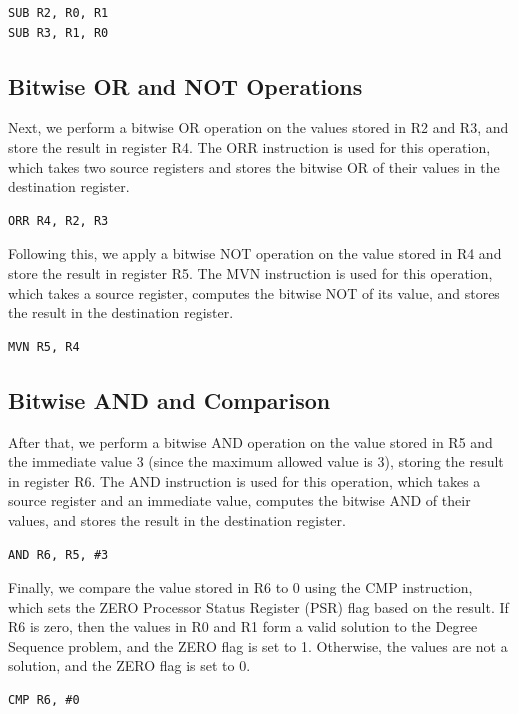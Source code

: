 \begin{verbatim}
SUB R2, R0, R1
SUB R3, R1, R0
\end{verbatim}

\subsection{Bitwise OR and NOT Operations}
Next, we perform a bitwise OR operation on the values stored in R2 and R3, and store the result in register R4. The ORR instruction is used for this operation, which takes two source registers and stores the bitwise OR of their values in the destination register.

\begin{verbatim}
ORR R4, R2, R3
\end{verbatim}

Following this, we apply a bitwise NOT operation on the value stored in R4 and store the result in register R5. The MVN instruction is used for this operation, which takes a source register, computes the bitwise NOT of its value, and stores the result in the destination register.

\begin{verbatim}
MVN R5, R4
\end{verbatim}

\subsection{Bitwise AND and Comparison}
After that, we perform a bitwise AND operation on the value stored in R5 and the immediate value 3 (since the maximum allowed value is 3), storing the result in register R6. The AND instruction is used for this operation, which takes a source register and an immediate value, computes the bitwise AND of their values, and stores the result in the destination register.

\begin{verbatim}
AND R6, R5, #3
\end{verbatim}

Finally, we compare the value stored in R6 to 0 using the CMP instruction, which sets the ZERO Processor Status Register (PSR) flag based on the result. If R6 is zero, then the values in R0 and R1 form a valid solution to the Degree Sequence problem, and the ZERO flag is set to 1. Otherwise, the values are not a solution, and the ZERO flag is set to 0.

\begin{verbatim}
CMP R6, #0
\end{verbatim}

